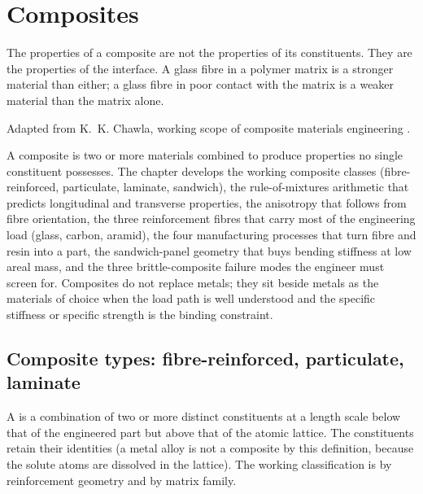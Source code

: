 \chapter{Composites}
\label{vol05:ch08}

\epigraph{The properties of a composite are not the properties of its
constituents. They are the properties of the interface. A glass fibre
in a polymer matrix is a stronger material than either; a glass fibre
in poor contact with the matrix is a weaker material than the matrix
alone.}{Adapted from K.~K. Chawla, working scope of composite
materials engineering \cite[ch.~1, pp.~3--7]{text:chawla-composites}.}


\noindent
A composite is two or more materials combined to produce properties no
single constituent possesses. The chapter develops the working
composite classes (fibre-reinforced, particulate, laminate, sandwich),
the rule-of-mixtures arithmetic that predicts longitudinal and
transverse properties, the anisotropy that follows from fibre
orientation, the three reinforcement fibres that carry most of the
engineering load (glass, carbon, aramid), the four manufacturing
processes that turn fibre and resin into a part, the sandwich-panel
geometry that buys bending stiffness at low areal mass, and the three
brittle-composite failure modes the engineer must screen for.
Composites do not replace metals; they sit beside metals as the
materials of choice when the load path is well understood and the
specific stiffness or specific strength is the binding constraint.

\section{Composite types: fibre-reinforced, particulate, laminate}

A  is a combination of two or more
distinct constituents at a length scale below that of the engineered
part but above that of the atomic lattice. The constituents retain
their identities (a metal alloy is not a composite by this definition,
because the solute atoms are dissolved in the lattice). The working
classification is by reinforcement geometry and by matrix family.

